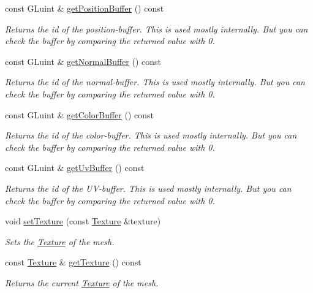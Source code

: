\begin{DoxyCompactItemize}
const G\-Luint \& \hyperlink{classburn_1_1_mesh_a617b88d25c58c342f02751d67cb5e29b}{get\-Position\-Buffer} () const 
\begin{DoxyCompactList}\small\item\em Returns the id of the position-\/buffer. This is used mostly internally. But you can check the buffer by comparing the returned value with 0. \end{DoxyCompactList}\item 
const G\-Luint \& \hyperlink{classburn_1_1_mesh_ad571f57e9a162b86585c0b3f288bbfc6}{get\-Normal\-Buffer} () const 
\begin{DoxyCompactList}\small\item\em Returns the id of the normal-\/buffer. This is used mostly internally. But you can check the buffer by comparing the returned value with 0. \end{DoxyCompactList}\item 
const G\-Luint \& \hyperlink{classburn_1_1_mesh_ae8757bde80c135f9d8e8e0291e00ffe5}{get\-Color\-Buffer} () const 
\begin{DoxyCompactList}\small\item\em Returns the id of the color-\/buffer. This is used mostly internally. But you can check the buffer by comparing the returned value with 0. \end{DoxyCompactList}\item 
const G\-Luint \& \hyperlink{classburn_1_1_mesh_a5bcc126c9f06b9f04549b02328f2fc72}{get\-Uv\-Buffer} () const 
\begin{DoxyCompactList}\small\item\em Returns the id of the U\-V-\/buffer. This is used mostly internally. But you can check the buffer by comparing the returned value with 0. \end{DoxyCompactList}\item 
void \hyperlink{classburn_1_1_mesh_a2457c00cd236e5933e725bb1d55db0d9}{set\-Texture} (const \hyperlink{classburn_1_1_texture}{Texture} \&texture)
\begin{DoxyCompactList}\small\item\em Sets the \hyperlink{classburn_1_1_texture}{Texture} of the mesh. \end{DoxyCompactList}\item 
const \hyperlink{classburn_1_1_texture}{Texture} \& \hyperlink{classburn_1_1_mesh_acbea44f2a2683c44728bb17e4691d406}{get\-Texture} () const 
\begin{DoxyCompactList}\small\item\em Returns the current \hyperlink{classburn_1_1_texture}{Texture} of the mesh. \end{DoxyCompactList}\item 

\end{DoxyCompactItemize}
